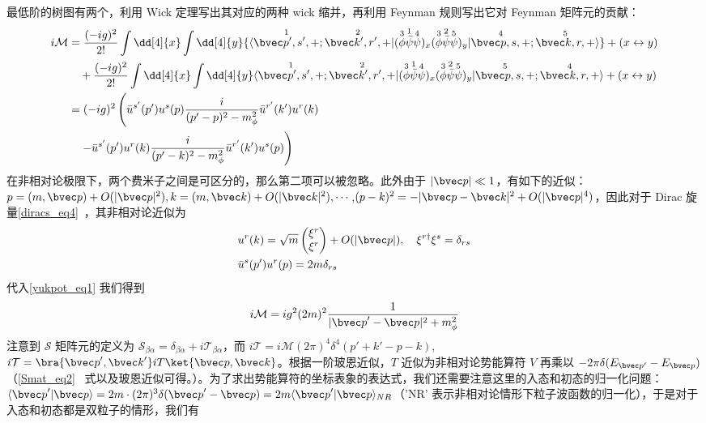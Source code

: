 最低阶的树图有两个，利用 Wick 定理写出其对应的两种 wick 缩并，再利用 Feynman 规则写出它对 Feynman 矩阵元的贡献：
\begin{equation}\label{yukpot_eq1}
\begin{aligned}
\notag i\mathcal{M}&=
\frac{(-ig)^2}{2!}\int \dd[4]{x} \int  \dd[4]{y} 
{
\langle\overset{1}{\bvec p',s',+};\overset{2}{\bvec k',r',+}|
(\overset{3}\phi  \overset{1}{\bar{\psi}} \overset{4}\psi)_x 
(\overset{3}\phi \overset{2}{\bar{\psi}} \overset{5}\psi)_y
|\overset{4}{\bvec p,s,+};\overset{5}{\bvec k,r,+} \rangle
}+(x\leftrightarrow y)\\
&\quad +
\frac{(-ig)^2}{2!}\int \dd[4]{x} \int  \dd[4]{y} 
\langle\overset{1}{\bvec p',s',+};\overset{2}{\bvec k',r',+}|
(\overset{3}\phi  \overset{1}{\bar{\psi}} \overset{4}\psi)_x 
(\overset{3}\phi \overset{2}{\bar{\psi}} \overset{5}\psi)_y
|\overset{5}{\bvec p,s,+};\overset{4}{\bvec k,r,+} \rangle
+(x\leftrightarrow y)\\
&=(-ig)^2\left(
 \bar u^{s'}(p')u^s(p) \frac{i}{(p'-p)^2-m_{\phi}^2} \bar u^{r'}(k') u^r(k)
\right.\\
&\left.\quad 
-\bar u^{s'}(p')u^r(k) \frac{i}{(p'-k)^2-m_{\phi}^2} \bar u^{r'}(k') u^{s}(p)  \right)
\end{aligned}
\end{equation}
在非相对论极限下，两个费米子之间是可区分的，那么第二项可以被忽略。此外由于 $|\bvec p|\ll 1$，有如下的近似：$p=(m,{\bvec p})+O(|{\bvec p}|^2),k=(m,{\bvec k})+O(|{\bvec k}|^2),\cdots$,$(p-k)^2=-|{\bvec p}-{\bvec k}|^2+O(|{\bvec p}|^4)$，因此对于 Dirac 旋量\autoref{diracs_eq4}~，其非相对论近似为
\begin{equation}
\begin{aligned}
&u^r(k)=\sqrt{m} \begin{pmatrix}\xi^r\\ \xi^r\end{pmatrix}+O(|{\bvec p}|),\quad  \xi^{r\dagger}\xi^s=\delta_{rs}\\
&\bar u^s(p') u^r(p)=2m \delta_{rs}
\end{aligned}
\end{equation}
代入\autoref{yukpot_eq1} 我们得到
\begin{equation}\label{yukpot_eq2}
\begin{aligned}
i\mathcal{M} = i g^2 (2m)^2 \frac{1}{|{\bvec p}'-{\bvec p}|^2+m_\phi^2}
\end{aligned}
\end{equation}
注意到 $\mathcal{S}$ 矩阵元的定义为 $\mathcal{S}_{\beta\alpha}=\delta_{\beta\alpha}+i\mathcal{T}_{\beta\alpha}$，而 $i\mathcal{T}=i\mathcal{M}(2\pi)^4 \delta^4(p'+k'-p-k)$, $i\mathcal{T} = \bra{{\bvec p}',{\bvec k}'}iT\ket{{\bvec p},{\bvec k}}$。根据一阶玻恩近似，$T$ 近似为非相对论势能算符 $V$ 再乘以 $-2\pi\delta(E_{\bvec p'}-E_{\bvec p})$（\autoref{Smat_eq2}~ 式以及玻恩近似可得。）。为了求出势能算符的坐标表象的表达式，我们还需要注意这里的入态和初态的归一化问题：$\langle{\bvec p}'|{\bvec p}\rangle=2m\cdot (2\pi)^3 \delta({\bvec p}'-{\bvec p}) = 2m \langle{\bvec p}'|{\bvec p}\rangle_{NR}$（'NR' 表示非相对论情形下粒子波函数的归一化），于是对于入态和初态都是双粒子的情形，我们有
